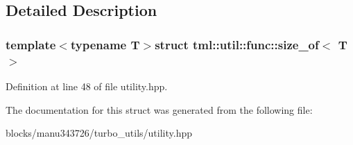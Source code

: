 \subsection{Detailed Description}
\subsubsection*{template$<$typename T$>$struct tml\+::util\+::func\+::size\+\_\+of$<$ T $>$}



Definition at line 48 of file utility.\+hpp.



The documentation for this struct was generated from the following file\+:\begin{DoxyCompactItemize}
\item 
blocks/manu343726/turbo\+\_\+utils/utility.\+hpp\end{DoxyCompactItemize}
